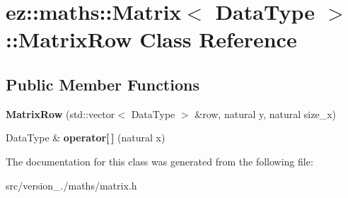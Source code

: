 \hypertarget{classez_1_1maths_1_1Matrix_1_1MatrixRow}{}\section{ez\+:\+:maths\+:\+:Matrix$<$ Data\+Type $>$\+:\+:Matrix\+Row Class Reference}
\label{classez_1_1maths_1_1Matrix_1_1MatrixRow}
\subsection*{Public Member Functions}
\begin{DoxyCompactItemize}
\item 
\mbox{\label{classez_1_1maths_1_1Matrix_1_1MatrixRow_a55fa07c1bfe2d6e13be70c051ba5cc52}} 
{\bfseries Matrix\+Row} (std\+::vector$<$ Data\+Type $>$ \&row, natural y, natural size\+\_\+x)
\item 
\mbox{\label{classez_1_1maths_1_1Matrix_1_1MatrixRow_a97aac7ce8b5b0f5f0f5a7e201649fcf2}} 
Data\+Type \& {\bfseries operator\mbox{[}$\,$\mbox{]}} (natural x)
\end{DoxyCompactItemize}


The documentation for this class was generated from the following file\+:\begin{DoxyCompactItemize}
\item 
src/version\+\_./maths/matrix.\+h\end{DoxyCompactItemize}
